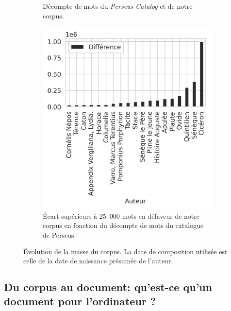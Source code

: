 {\begin{figure}
\begin{subfigure}{0.45\hsize}
    \caption{Décompte de mots du \textit{Perseus Catalog} et de notre corpus.}
    \label{fig:chap1:accum-mot-diff-perseus-catalog}
    \end{subfigure}%
    \hfill%
    \begin{subfigure}{0.45\hsize}
        \centering
        \includegraphics[width=.8\linewidth]{figures/chap1/part2/ecartsAuteurs.png}
        \caption{Écart supérieurs à 25~000 mots en défaveur de notre corpus en fonction du décompte de mots du catalogue de Perseus.}
        \label{fig:chap1:ecarts-auteurs}
    \end{subfigure}%
    \caption{Évolution de la masse du corpus. La date de composition utilisée est celle de la date de naissance présumée de l'auteur.}
\end{figure}%
\clearpage
}
\clearpage

\subsection{Du corpus au document: qu’est-ce qu’un document pour l’ordinateur ?}

